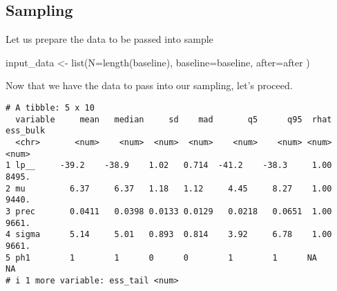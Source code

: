 \documentclass[
  letterpaper,
  DIV=11,
  numbers=noendperiod]{scrreprt}
\newenvironment{Shaded}{\begin{snugshade}}{\end{snugshade}}
\newcommand{\AttributeTok}[1]{\textcolor[rgb]{0.40,0.45,0.13}{#1}}
\newcommand{\CommentTok}[1]{\textcolor[rgb]{0.37,0.37,0.37}{#1}}
\newcommand{\DecValTok}[1]{\textcolor[rgb]{0.68,0.00,0.00}{#1}}
\newcommand{\FunctionTok}[1]{\textcolor[rgb]{0.28,0.35,0.67}{#1}}
\newcommand{\NormalTok}[1]{\textcolor[rgb]{0.00,0.23,0.31}{#1}}
\newcommand{\OtherTok}[1]{\textcolor[rgb]{0.00,0.23,0.31}{#1}}
\newcommand{\SpecialCharTok}[1]{\textcolor[rgb]{0.37,0.37,0.37}{#1}}
\begin{document}
\hypertarget{sampling-3}{%
\subsection*{Sampling}\label{sampling-3}}

Let us prepare the data to be passed into sample

\begin{Shaded}
\begin{Highlighting}[]
\NormalTok{input\_data }\OtherTok{\textless{}{-}} \FunctionTok{list}\NormalTok{(}\AttributeTok{N=}\FunctionTok{length}\NormalTok{(baseline), }
                   \AttributeTok{baseline=}\NormalTok{baseline,}
                   \AttributeTok{after=}\NormalTok{after}
\NormalTok{)}
\end{Highlighting}
\end{Shaded}

Now that we have the data to pass into our sampling, let's proceed.

\begin{Shaded}
\end{Shaded}

\begin{Shaded}
\end{Shaded}

\begin{verbatim}
# A tibble: 5 x 10
  variable     mean   median     sd    mad       q5      q95  rhat ess_bulk
  <chr>       <num>    <num>  <num>  <num>    <num>    <num> <num>    <num>
1 lp__     -39.2    -38.9    1.02   0.714  -41.2    -38.3     1.00    8495.
2 mu         6.37     6.37   1.18   1.12     4.45     8.27    1.00    9440.
3 prec       0.0411   0.0398 0.0133 0.0129   0.0218   0.0651  1.00    9661.
4 sigma      5.14     5.01   0.893  0.814    3.92     6.78    1.00    9661.
5 ph1        1        1      0      0        1        1      NA         NA 
# i 1 more variable: ess_tail <num>
\end{verbatim}
\end{document}
